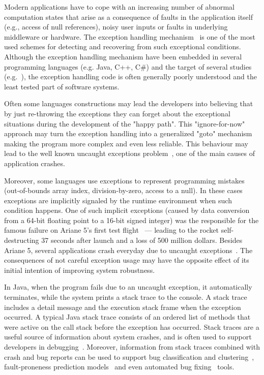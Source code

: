 \documentclass[conference]{IEEEtran}
\begin{document}
Modern applications have to cope with an increasing number of abnormal
computation states that arise as a consequence of faults in the application
itself (e.g., access of null references), noisy user inputs or faults in
underlying middleware or hardware. The exception handling
mechanism~\cite{goodenough1975exception} is one of the most used schemes for
detecting and recovering from such exceptional conditions. Although the
exception handling mechanism have been embedded in several programming languages
(e.g. Java, C++, C\#) and the target of several studies
(e.g.~\cite{miller1997issues,Robil00,shah2010understanding,
garcia2007extracting,garcia2001comparative,cabral2007exception,coelho2011unveiling}),
the exception handling code is often generally poorly understood and the least
tested part of software systems.

Often some languages constructions may lead the developers into believing that
by just re-throwing the exceptions they can forget about the exceptional
situations during the development of the "happy path". This "ignore-for-now"
approach may turn the exception handling into a generalized "goto"
mechanism~\cite{mandrioli1992advances} making the program more complex and even
less reliable. This behaviour may lead to the well known uncaught exceptions
problem~\cite{jo2004uncaught}, one of the main causes of application crashes.

Moreover, some languages use exceptions to represent programming mistakes
(out-of-bounds array index, division-by-zero, access to a null). In these cases
exceptions are implicitly signaled by the runtime environment when such
condition happens. One of such implicit exceptions (caused by data conversion
from a 64-bit floating point to a 16-bit signed integer) was the responsible for
the famous failure on Ariane 5's first test flight~\cite{lions1996ariane} ---
leading to the rocket self-destructing 37 seconds after launch and a loss of 500
million dollars. Besides Ariane 5, several applications crash everyday due to
uncaught exceptions~\cite{jo2004uncaught}. The consequences of not careful
exception usage may have the opposite effect of its initial intention of
improving system robustness.

In Java, when the program fails due to an uncaught exception, it automatically
terminates, while the system prints a stack trace to the console. A stack trace
includes a detail message and the execution stack frame when the exception
occurred. A typical Java stack trace consists of an ordered list of methods that
were active on the call stack before the exception has occurred. Stack traces
are a useful source of information about system crashes, and is often used to
support developers in debugging~\cite{schroter2010stack}. Moreover, information
from stack traces combined with crash and bug reports can be used to support bug
classification and clustering~\cite{wang2013improving, kim2011crash,
dhaliwal2011classifying}, fault-proneness prediction
models~\cite{kim2013predicting} and even automated bug
fixing~\cite{sinha2009fault} tools.
\end{document}

